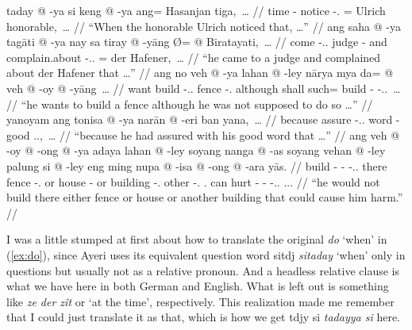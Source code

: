\documentclass[12pt,paper=a4]{scrartcl}
\newcommand{\fw}[1]{\textit{#1}} %
\newcommand{\ayr}[1]{{\Tagati #1}}
\newcommand{\xayr}[3]{{\Tagati #1} \emph{#2} \enquote*{#3}}
\begin{document}

\pex
	\a \label{ex:do} \begingl
		\gla taday @ -ya si keng @ -ya ang= Hasanjan tiga,~… //
		\glb time -\Loc{} \Rel{} notice -\Tsg{}.\M{} \Aarg{}= Ulrich 
			honorable,~… //
		\glft \enquote{When the honorable Ulrich noticed that, …} //
	\endgl
	\a \begingl
		\gla ang saha @ -ya tagāti @ -ya nay sa tiray @ -yāng Ø= @ 
			{Biratayati},~… //
		\glb \AgtT{} come -\Tsg{}.\M{}.\Top{} judge -\Loc{} and \PatT{} 
			complain.about -\Tsg{}.\M{}.\Aarg{} \Top{}= {der 
			Hafener,}~… //
		\glft \enquote{he came to a judge and complained about der 
			Hafener that …} //
	\endgl
	\a \begingl
		\gla ang no veh @ -ya lahan @ -ley nārya mya da= @ veh @ -oy @ 
			-yāng~… //
		\glb \AgtT{} want build -\Tsg{}.\M{}.\Top{} fence 
			-\Parg{}.\Inan{} although shall such= build 
			-\Neg{} -\Tsg{}.\M{}.\Aarg{}~… //
		\glft \enquote{he wants to build a fence although he was not 
			supposed to do so …} //
	\endgl
	\a \begingl
		\gla yanoyam ang tonisa @ -ya narān @ -eri ban yana,~… //
		\glb because \AgtT{} assure -\Tsg{}.\M{}.\Top{} word -\Ins{} 
			good \Tsg{}.\M{}.\Gen{},~… //
		\glft \enquote{because he had assured with his good word that 
			…} //
	\endgl
	\a \begingl
		\gla ang veh @ -oy @ -ong @ -ya adaya lahan @ -ley soyang nanga 
			@ -as soyang vehan @ -ley palung si @ -ley eng ming nupa 
			@ -isa @ -ong @ -ara yās. //
		\glb \AgtT{} build -\Neg{} -\Irr{} -\Tsg{}.\M{}.\Top{} there 
			fence -\Parg{}.\Inan{} or house -\Parg{} or building 
			-\Parg{}.\Inan{} other \Rel{} -\Parg{}.\Inan{} 
			\AgtT{}.\Inan{} can hurt -\Caus{} -\Irr{} 
			-\Tsg{}.\Inan{}.\Top{} \Tsg{}.\M{}.\Parg{}. //
		\glft \enquote{he would not build there either fence or house or 
			another building that could cause him harm.} //
	\endgl
\xe

I was a little stumped at first about how to translate the original \fw{do} 
`when' in (\ref{ex:do}), since Ayeri uses its equivalent question word 
\xayr{sitdj}{sitaday}{when} only in questions but usually not as a relative 
pronoun. And a headless relative clause is what we have here in both German and 
English. What is left out is something like \fw{ze der zît} or `at the time', 
respectively. This realization made me remember that I could just translate it 
as that, which is how we get \ayr{tdjy si} \fw{tadayya si} here.
\end{document}
